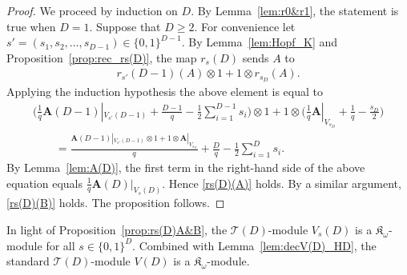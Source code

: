 \documentclass[pdftex]{sigma}%
\def\A{\mathbf A}
\def\K{\mathfrak K_\omega}
\def\T{\mathcal T}
\numberwithin{equation}{section}
\begin{document}
\begin{proof}
We proceed by induction on $D$. By Lemma~\ref{lem:r0&r1}, the statement is true when $D=1$. Suppose that $D\geq 2$.
For convenience let $s'=(s_1,s_2,\dots,s_{D-1})\in \{0,1\}^{D-1}$.
By Lemma~\ref{lem:Hopf_K} and Proposition~\ref{prop:rec_rs(D)}, the map $r_s(D)$ sends $A$ to
\begin{gather*}
r_{s'}(D-1)(A)\otimes 1+1\otimes r_{s_D}(A).
\end{gather*}
Applying the induction hypothesis the above element is equal to
\begin{gather*}
\bigg(\frac{1}{q}\A(D-1)|_{V_{s'}(D-1)}+\frac{D-1}{q}-\frac{1}{2}\sum_{i=1}^{D-1} s_i\bigg)
\otimes 1+1\otimes\bigg(\frac{1}{q}\A|_{V_{s_D}}+\frac{1}{q}-\frac{s_D}{2}\bigg)
\\ \qquad
{}=\frac{\A(D-1)|_{V_{s'}(D-1)}\otimes 1+
1\otimes \A|_{V_{s_D}}}{q}+\frac{D}{q}-\frac{1}{2}\sum_{i=1}^D s_i.
\end{gather*}
By Lemma~\ref{lem:A(D)}, the first term in the right-hand side of the above equation equals $\frac{1}{q} \A(D)|_{V_s(D)}$. Hence \eqref{rs(D)(A)} holds.
By a similar argument, \eqref{rs(D)(B)} holds.
The proposition follows.
\end{proof}

In light of Proposition~\ref{prop:rs(D)A&B}, the $\T(D)$-module $V_s(D)$ is a $\K$-module for all $s\in \{0,1\}^D$. Combined with Lemma~\ref{lem:decV(D)_HD}, the standard $\T(D)$-module $V(D)$ is a $\K$-module.
\end{document}
